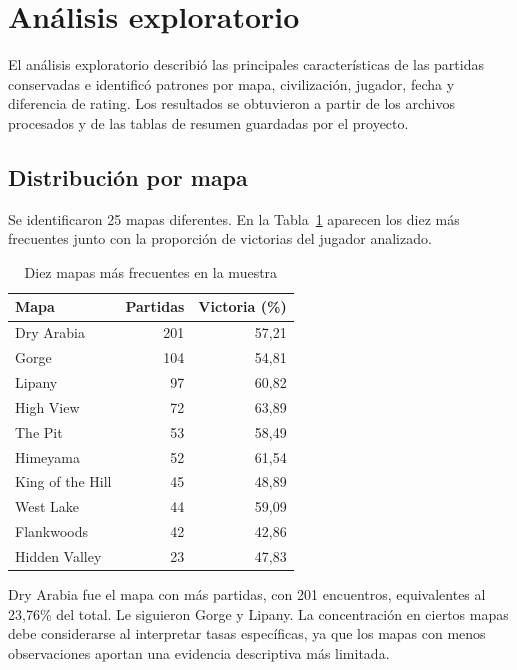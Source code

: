 \documentclass[12pt,a4paper]{article}
\begin{document}
\section{Análisis exploratorio}

El análisis exploratorio describió las principales características de las partidas conservadas e identificó patrones por mapa, civilización, jugador, fecha y diferencia de rating. Los resultados se obtuvieron a partir de los archivos procesados y de las tablas de resumen guardadas por el proyecto.

\subsection{Distribución por mapa}

Se identificaron 25 mapas diferentes. En la Tabla~\ref{tab:mapas} aparecen los diez más frecuentes junto con la proporción de victorias del jugador analizado.

\begin{table}[htbp]
\centering\small
\caption{Diez mapas más frecuentes en la muestra}
\label{tab:mapas}
\begin{tabular}{lrr}
\toprule
\textbf{Mapa} & \textbf{Partidas} & \textbf{Victoria (\%)}\\
\midrule
Dry Arabia & 201 & 57,21\\
Gorge & 104 & 54,81\\
Lipany & 97 & 60,82\\
High View & 72 & 63,89\\
The Pit & 53 & 58,49\\
Himeyama & 52 & 61,54\\
King of the Hill & 45 & 48,89\\
West Lake & 44 & 59,09\\
Flankwoods & 42 & 42,86\\
Hidden Valley & 23 & 47,83\\
\bottomrule
\end{tabular}
\end{table}

Dry Arabia fue el mapa con más partidas, con 201 encuentros, equivalentes al 23,76\% del total. Le siguieron Gorge y Lipany. La concentración en ciertos mapas debe considerarse al interpretar tasas específicas, ya que los mapas con menos observaciones aportan una evidencia descriptiva más limitada.
\end{document}
